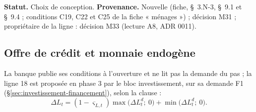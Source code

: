 \documentclass[11pt,a4paper]{article}
\begin{document}
\begin{proposee}
\textbf{Statut.} Choix de conception. \textbf{Provenance.} Nouvelle (fiche, \S~3.N-3, \S~9.1 et \S~9.4 ; conditions C19, C22 et C25 de la fiche « ménages ») ; décision M31 ; propriétaire de la ligne : décision M33 (lecture A8, ADR 0011).
\end{proposee}

\subsection{Offre de crédit et monnaie endogène}
\label{sec:banque-offre}
\begin{proposee}
La banque publie ses conditions à l'ouverture et ne lit pas la demande du pas ; la ligne 18 est proposée en phase 3 par le bloc investissement, sur sa demande F1 (\S\ref{sec:investissement-financement}), selon la clause :
\begin{equation*}
\Delta L_t = (1 - \varsigma_{L,t}) \max\bigl(\Delta L^d_t ;\ 0\bigr) + \min\bigl(\Delta L^d_t ;\ 0\bigr) .
\end{equation*}


\end{proposee}
\end{document}
